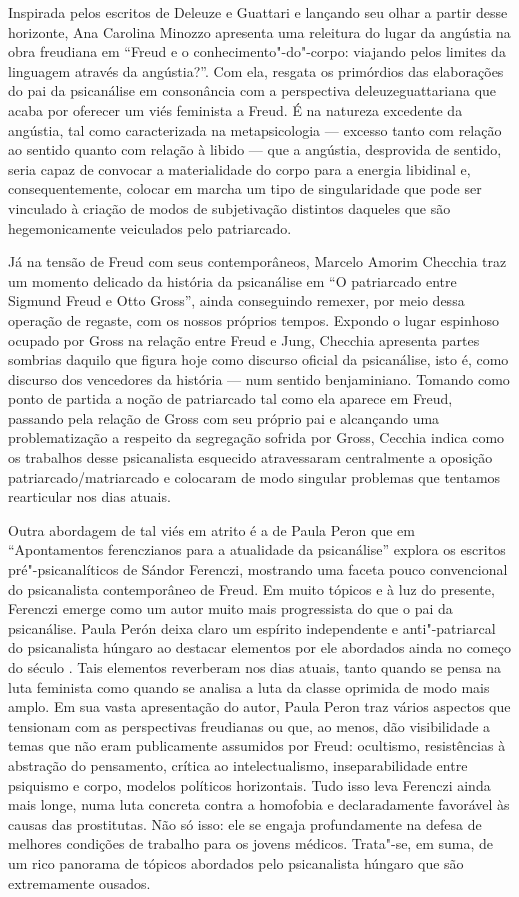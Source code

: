 Inspirada pelos escritos de Deleuze e Guattari e lançando seu olhar a
partir desse horizonte, Ana Carolina Minozzo apresenta uma releitura do
lugar da angústia na obra freudiana em ``Freud e o
conhecimento"-do"-corpo: viajando pelos limites da linguagem através da
angústia?''. Com ela, resgata os primórdios das elaborações do pai da
psicanálise em consonância com a perspectiva deleuzeguattariana que
acaba por oferecer um viés feminista a Freud. É na natureza excedente da
angústia, tal como caracterizada na metapsicologia --- excesso tanto com
relação ao sentido quanto com relação à libido --- que a angústia,
desprovida de sentido, seria capaz de convocar a materialidade do corpo
para a energia libidinal e, consequentemente, colocar em marcha um tipo
de singularidade que pode ser vinculado à criação de modos de
subjetivação distintos daqueles que são hegemonicamente veiculados pelo
patriarcado.

Já na tensão de Freud com seus contemporâneos, Marcelo Amorim Checchia
traz um momento delicado da história da psicanálise em ``O patriarcado
entre Sigmund Freud e Otto Gross'', ainda conseguindo remexer, por meio
dessa operação de regaste, com os nossos próprios tempos. Expondo o
lugar espinhoso ocupado por Gross na relação entre Freud e Jung,
Checchia apresenta partes sombrias daquilo que figura hoje como discurso
oficial da psicanálise, isto é, como discurso dos vencedores da história
--- num sentido benjaminiano. Tomando como ponto de partida a noção de
patriarcado tal como ela aparece em Freud, passando pela relação de
Gross com seu próprio pai e alcançando uma problematização a respeito da
segregação sofrida por Gross, Cecchia indica como os trabalhos desse
psicanalista esquecido atravessaram centralmente a oposição
patriarcado/matriarcado e colocaram de modo singular problemas que
tentamos rearticular nos dias atuais.

Outra abordagem de tal viés em atrito é a de Paula Peron que em
``Apontamentos ferenczianos para a atualidade da psicanálise'' explora
os escritos pré"-psicanalíticos de Sándor Ferenczi, mostrando uma faceta
pouco convencional do psicanalista contemporâneo de Freud. Em muito
tópicos e à luz do presente, Ferenczi emerge como um autor muito mais
progressista do que o pai da psicanálise. Paula Perón deixa claro um
espírito independente e anti"-patriarcal do psicanalista húngaro ao
destacar elementos por ele abordados ainda no começo do século . Tais
elementos reverberam nos dias atuais, tanto quando se pensa na luta
feminista como quando se analisa a luta da classe oprimida de modo mais
amplo. Em sua vasta apresentação do autor, Paula Peron traz vários
aspectos que tensionam com as perspectivas freudianas ou que, ao menos,
dão visibilidade a temas que não eram publicamente assumidos por Freud:
ocultismo, resistências à abstração do pensamento, crítica ao
intelectualismo, inseparabilidade entre psiquismo e corpo, modelos
políticos horizontais. Tudo isso leva Ferenczi ainda mais longe, numa
luta concreta contra a homofobia e declaradamente favorável às causas
das prostitutas. Não só isso: ele se engaja profundamente na defesa de
melhores condições de trabalho para os jovens médicos. Trata"-se, em
suma, de um rico panorama de tópicos abordados pelo psicanalista húngaro
que são extremamente ousados.

